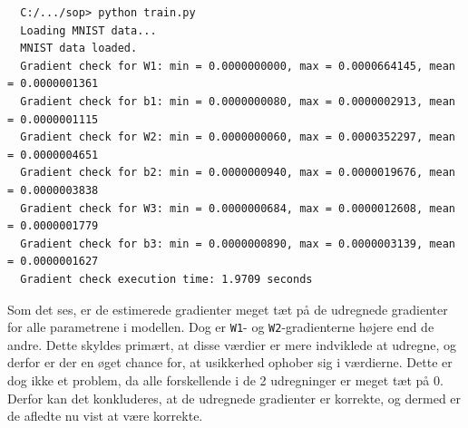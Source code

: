\documentclass{article}
\begin{document}
\begin{verbatim}
  C:/.../sop> python train.py
  Loading MNIST data...
  MNIST data loaded.
  Gradient check for W1: min = 0.0000000000, max = 0.0000664145, mean = 0.0000001361
  Gradient check for b1: min = 0.0000000080, max = 0.0000002913, mean = 0.0000001115
  Gradient check for W2: min = 0.0000000060, max = 0.0000352297, mean = 0.0000004651
  Gradient check for b2: min = 0.0000000940, max = 0.0000019676, mean = 0.0000003838
  Gradient check for W3: min = 0.0000000684, max = 0.0000012608, mean = 0.0000001779
  Gradient check for b3: min = 0.0000000890, max = 0.0000003139, mean = 0.0000001627
  Gradient check execution time: 1.9709 seconds
\end{verbatim}
Som det ses, er de estimerede gradienter meget tæt på de udregnede gradienter for alle parametrene i modellen. Dog er \texttt{W1}- og \texttt{W2}-gradienterne højere end de andre. Dette skyldes primært, at disse værdier er mere indviklede at udregne, og derfor er der en øget chance for, at usikkerhed ophober sig i værdierne. Dette er dog ikke et problem, da alle forskellende i de 2 udregninger er meget tæt på 0. Derfor kan det konkluderes, at de udregnede gradienter er korrekte, og dermed er de afledte nu vist at være korrekte.
\end{document}
